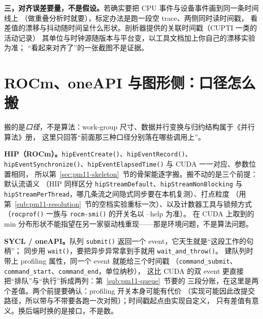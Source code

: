 \documentclass[12pt,a4paper,fontset=fandol]{ctexbook}
\newcommand{\Fn}[1]{\texttt{#1()}}
\newcommand{\Tp}[1]{\texttt{#1}}
\newcommand{\Bk}{\discretionary{}{}{}}
\begin{document}
\textbf{三，对齐误差要量，不是假设。}若确实要把 CPU 事件与设备事件画到同一条时间线上
（做重叠分析时就要），标定办法是跑一段空 trace、两侧同时读时间戳，
看差值的漂移与抖动随时间呈什么形状。剖析器提供的关联时间戳（CUPTI 一类的活动记录）
其单位与时钟源随版本与平台变，以工具文档加上你自己的漂移实验为准；
``看起来对齐了''的一张截图不是证据。

\section{ROCm、oneAPI 与图形侧：口径怎么搬}
\label{sec:pm11-portability}

搬的是\emph{口径}，不是算法：work-group 尺寸、数据并行变换与归约结构属于《并行算法》册，
这里只回答``前面那三种口径分别落在哪些调用上''。

\textbf{HIP（ROCm）。}\Fn{hipEvent{\Bk}Create}、\Fn{hipEvent{\Bk}Record}、
\Fn{hipEvent{\Bk}Synchronize}、\Fn{hipEvent{\Bk}ElapsedTime} 与 CUDA 一一对应、参数位置相同，
所以第~\ref{sec:pm11-skeleton}~节的骨架能逐字搬。搬不动的是三个前提：默认流语义
（HIP 同样区分 \Tp{hipStream{\Bk}Default}、\Tp{hipStream{\Bk}NonBlocking} 与
\Tp{hipStream{\Bk}PerThread}，哪几条流之间隐式同步要在本机复测）、打点粒度
（用第~\ref{sub:pm11-resolution}~节的空档实验重标一次）、以及计数器工具与锁频方式
（\Fn{rocprof} 一族与 \Fn{rocm-smi} 的开关名以 --help 为准）。
在 CUDA 上取到的 min 分布形状不能指望在另一家驱动栈重现——那是环境问题，不是算法问题。

\textbf{SYCL / oneAPI。}队列 \Fn{submit} 返回一个 event，它天生就是``这段工作的句柄''；
同步用 \Fn{wait}，要把异步异常拿到手就用 \Fn{wait{\Bk}\_and{\Bk}\_throw}。
建队列时带上 profiling 属性，同一个 event 就能给三个时间戳
（\Tp{command{\Bk}\_submit}、\Tp{command{\Bk}\_start}、\Tp{command{\Bk}\_end}，单位纳秒），
这比 CUDA 的双 event 更直接把``排队''与``执行''拆成两列：第~\ref{sub:pm11-queue}~节要的
三段分账，在这里是两个差值。两个前提要确认：profiling 开关本身可能有代价
（实现可能因此改提交路径，所以带与不带要各跑一次对照）；时间戳起点由实现自定义，
只有差值有意义。换后端时换的是接口，不是数。
\end{document}
